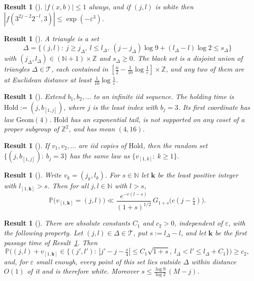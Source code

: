 \documentclass[11pt]{amsart}
\newtheorem{tresult}[lemma]{Result}   %
\theoremstyle{remark}
\renewcommand{\P}{\mathbb{P}}
\newcommand{\Z}{\mathbb{Z}}
\newcommand{\Hold}{\mathrm{Hold}}
\newcommand{\Geom}{\mathrm{Geom}}
\newcommand{\T}[1]{\cite[#1]{Tao22}}   %
\theoremstyle{plain}
\begin{document}
\begin{tresult}[{\T{(7.6) and Lemma 7.2}}]\label{res:white}
$|f(x,b)|\le1$ always, and if $(j,l)$ is white then $|f(3^{2j-2}2^{-l},3)|\le\exp(-\varepsilon^3)$.
\end{tresult}

\begin{tresult}[{\T{(7.11) and Lemma 7.4}}]\label{res:triangles}
A \emph{triangle} is a set
\[
\Delta=\{(j,l):\ j\ge j_\Delta,\ l\le l_\Delta,\ (j-j_\Delta)\log9+(l_\Delta-l)\log2\le s_\Delta\}
\]
with $(j_\Delta,l_\Delta)\in(\mathbb N+1)\times\Z$ and $s_\Delta\ge0$. The black set is a disjoint union of triangles $\Delta\in\mathcal T$, each contained in $[\frac n2-\frac1{10}\log\frac1\varepsilon]\times\Z$, and any two of them are at Euclidean distance at least $\frac1{10}\log\frac1\varepsilon$.
\end{tresult}

\begin{tresult}[{\T{\S7.3 and Lemma 7.6}}]\label{res:hold}
Extend $b_1,b_2,\dots$ to an infinite iid sequence. The \emph{holding time} is $\Hold:=(j,b_{[1,j]})$, where $j$ is the least index with $b_j=3$. Its first coordinate has law $\Geom(4)$. $\Hold$ has an exponential tail, is not supported on any coset of a proper subgroup of $\Z^2$, and has mean $(4,16)$.
\end{tresult}

\begin{tresult}[{\T{(7.26)--(7.28)}}]\label{res:renewal}
If $v_1,v_2,\dots$ are iid copies of $\Hold$, then the random set $\{(j,b_{[1,j]}):\ b_j=3\}$ has the same law as $\{v_{[1,k]}:\ k\ge1\}$.
\end{tresult}

\begin{tresult}[{\T{Lemma 7.7}}]\label{res:passage}
Write $v_k=(j_k,l_k)$. For $s\in\mathbb N$ let $\mathbf k$ be the least positive integer with $l_{[1,\mathbf k]}>s$. Then for all $j,l\in\mathbb N$ with $l>s$,
\[
\P\big(v_{[1,\mathbf k]}=(j,l)\big)\ll\frac{e^{-c(l-s)}}{(1+s)^{1/2}}\,G_{1+s}\big(c(j-\tfrac s4)\big).
\]
\end{tresult}

\begin{tresult}[{\T{(7.50)--(7.52)}}]\label{res:exit}
There are absolute constants $C_1$ and $c_2>0$, independent of $\varepsilon$, with the following property. Let $(j,l)\in\Delta\in\mathcal T$, put $s:=l_\Delta-l$, and let $\mathbf k$ be the first passage time of Result~\ref{res:passage}. Then
\[
\P\Big((j,l)+v_{[1,\mathbf k]}\in\big\{(j',l'):\ |j'-j-\tfrac s4|\le C_1\sqrt{1+s},\ l_\Delta<l'\le l_\Delta+C_1\big\}\Big)\ge c_2,
\]
and, for $\varepsilon$ small enough, every point of this set lies outside $\Delta$ within distance $O(1)$ of it and is therefore white. Moreover $s\le\frac{\log9}{\log2}\,(M-j)$.
\end{tresult}
\end{document}
